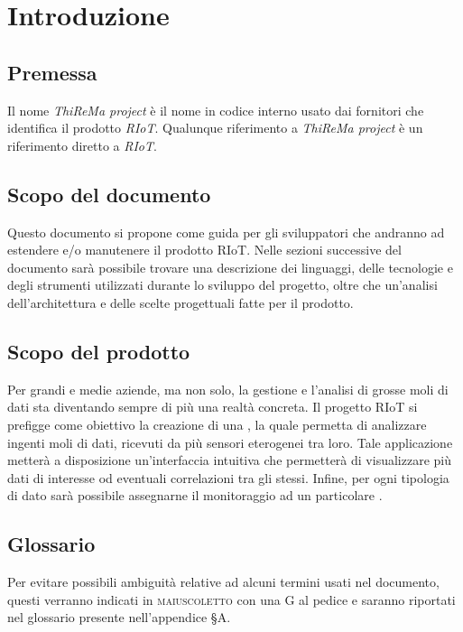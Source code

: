 \section{Introduzione}
	\subsection{Premessa}
		Il nome \textit{ThiReMa project} è il nome in codice interno usato dai fornitori che identifica il prodotto \textit{RIoT}. Qualunque riferimento a \textit{ThiReMa project} è un riferimento diretto a \textit{RIoT}. 
	\subsection{Scopo del documento}
		Questo documento si propone come guida per gli sviluppatori che andranno ad estendere e/o manutenere il prodotto RIoT. 
		\newline
		Nelle sezioni successive del documento sarà possibile trovare una descrizione dei linguaggi, delle tecnologie e degli strumenti utilizzati durante lo sviluppo del progetto, oltre che un'analisi dell'architettura e delle scelte progettuali fatte per il prodotto.
	\subsection{Scopo del prodotto}
	 	Per grandi e medie aziende, ma non solo, la gestione e l'analisi di grosse moli di dati sta diventando sempre di più una realtà concreta.
	 	\newline
		Il progetto RIoT si prefigge come obiettivo la creazione di una , la quale permetta di analizzare ingenti moli di dati, ricevuti da più sensori eterogenei tra loro. Tale applicazione metterà a disposizione un'interfaccia intuitiva che permetterà di visualizzare più dati di interesse od eventuali correlazioni tra gli stessi. Infine, per ogni tipologia di dato sarà possibile assegnarne il monitoraggio ad un particolare .	
	\subsection{Glossario}
		Per evitare possibili ambiguità relative ad alcuni termini usati nel documento, questi verranno indicati in \textsc{maiuscoletto} con una G al pedice e saranno riportati nel glossario presente nell'appendice \S A.
